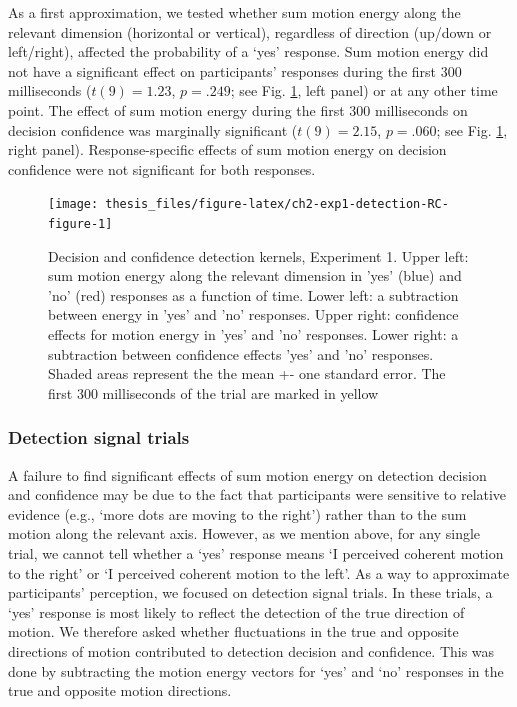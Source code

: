 \documentclass[12pt,twoside]{reedthesis}
\begin{document}
As a first approximation, we tested whether sum motion energy along the relevant dimension (horizontal or vertical), regardless of direction (up/down or left/right), affected the probability of a `yes' response. Sum motion energy did not have a significant effect on participants' responses during the first 300 milliseconds (\(t(9) = 1.23\), \(p = .249\); see Fig. \ref{fig:ch2-exp1-detection-RC-figure}, left panel) or at any other time point. The effect of sum motion energy during the first 300 milliseconds on decision confidence was marginally significant (\(t(9) = 2.15\), \(p = .060\); see Fig. \ref{fig:ch2-exp1-detection-RC-figure}, right panel). Response-specific effects of sum motion energy on decision confidence were not significant for both responses.
\begin{figure}
\texttt{[image: thesis\_files/figure-latex/ch2-exp1-detection-RC-figure-1]} \caption[Reverse correlation of detection trials, Exp. 1]{Decision and confidence detection kernels, Experiment 1. Upper left: sum motion energy along the relevant dimension in 'yes' (blue) and 'no' (red) responses as a function of time. Lower left: a subtraction between energy in 'yes' and 'no' responses. Upper right: confidence effects for motion energy in 'yes' and 'no' responses. Lower right: a subtraction between confidence effects 'yes' and 'no' responses. Shaded areas represent the the mean +- one standard error. The first 300 milliseconds of the trial are marked in yellow}\label{fig:ch2-exp1-detection-RC-figure}
\end{figure}
\hypertarget{detection-signal-trials}{%
\subsubsection*{Detection signal trials}\label{detection-signal-trials}}

A failure to find significant effects of sum motion energy on detection decision and confidence may be due to the fact that participants were sensitive to relative evidence (e.g., `more dots are moving to the right') rather than to the sum motion along the relevant axis. However, as we mention above, for any single trial, we cannot tell whether a `yes' response means `I perceived coherent motion to the right' or `I perceived coherent motion to the left'. As a way to approximate participants' perception, we focused on detection signal trials. In these trials, a `yes' response is most likely to reflect the detection of the true direction of motion. We therefore asked whether fluctuations in the true and opposite directions of motion contributed to detection decision and confidence. This was done by subtracting the motion energy vectors for `yes' and `no' responses in the true and opposite motion directions.
\end{document}
